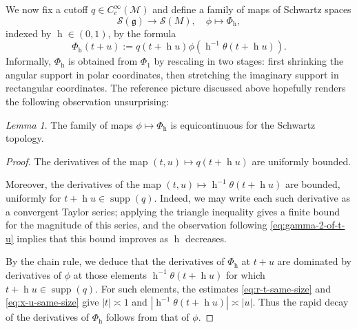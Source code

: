 \documentclass[reqno,10pt]{amsart}
\theoremstyle{plain} %
\theoremstyle{definition}
\theoremstyle{plain} %
\theoremstyle{remark}
\theoremstyle{itplain} %
\newtheorem*{lemma*}{Lemma}
\theoremstyle{remark} %
\numberwithin{equation}{section}
\DeclareMathOperator{\supp}{supp}
\DeclareMathOperator{\h}{h}
\begin{document}
We now fix a cutoff $q \in C_c^\infty(\mathcal{M})$ and define a family of maps of Schwartz spaces
\begin{equation*}
  \mathcal{S}(\mathfrak{g}) \rightarrow \mathcal{S}(M),
  \quad 
  \phi \mapsto \Phi_{\h},
\end{equation*}
indexed by $\h \in (0,1)$, by the formula
\begin{equation*}
  \Phi_{\h}(t+ u) := q(t + \h u) \phi(\h^{-1} \theta(t + \h u)).
\end{equation*}
Informally, $\Phi_{\h}$ is obtained from $\Phi_{1}$ by rescaling in two stages: first shrinking the angular support in polar coordinates, then stretching the imaginary support in rectangular coordinates.  The reference picture discussed above hopefully renders the following observation unsurprising:
\begin{lemma*}
  The family of maps $\phi \mapsto \Phi_{\h}$ is equicontinuous for the Schwartz topology.
\end{lemma*}
\begin{proof}
  The derivatives of the map $(t,u) \mapsto q(t+\h u)$ are uniformly bounded.

  Moreover, the derivatives of the map $(t,u) \mapsto \h^{-1} \theta(t + \h u)$ are bounded, uniformly for $t+\h u \in \supp(q)$.  Indeed, we may write each such derivative as a convergent Taylor series; applying the triangle inequality gives a finite bound for the magnitude of this series, and the observation following \eqref{eq:gamma-2-of-t-u} implies that this bound improves as $\h$ decreases.

  By the chain rule, we deduce that the derivatives of $\Phi_{\h}$ at $t + u$ are dominated by derivatives of $\phi$ at those elements $\h^{-1} \theta(t +\h u)$ for which $t + \h u \in \supp(q)$.  For such elements, the estimates \eqref{eq:r-t-same-size} and \eqref{eq:x-u-same-size} give $|t| \asymp 1$ and $|\h^{-1} \theta(t + \h u)| \asymp |u|$.  Thus the rapid decay of the derivatives of $\Phi_{\h}$ follows from that of $\phi$.
\end{proof}
\end{document}
